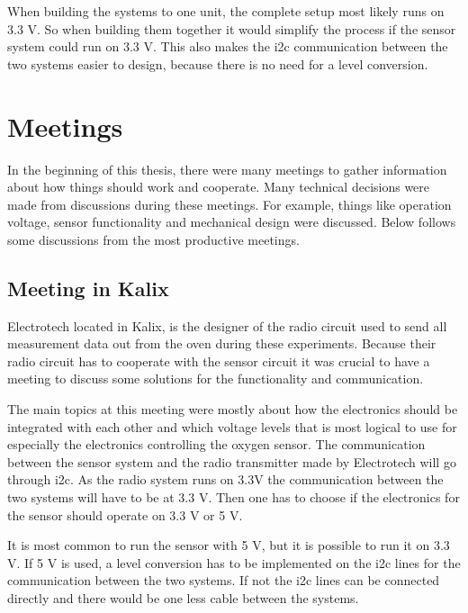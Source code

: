 When building the systems to one unit, the complete setup most likely runs on 3.3 V. So when building them together it would simplify the process if the sensor system could run on 3.3 V. This also makes the \ac{i2c} communication between the two systems easier to design, because there is no need for a level conversion.


\section{Meetings}





In the beginning of this thesis, there were many meetings to gather information about how things should work and cooperate. Many technical decisions were made from discussions during these meetings. For example, things like operation voltage, sensor functionality and mechanical design were discussed. Below follows some discussions from the most productive meetings.

\subsection{Meeting in Kalix}%

Electrotech located in Kalix, is the designer of the radio circuit used to send all measurement data out from the oven during these experiments. Because their radio circuit has to cooperate with the sensor circuit it was crucial to have a meeting to discuss some solutions for the functionality and communication.

The main topics at this meeting were mostly about how the electronics should be integrated with each other and which voltage levels that is most logical to use for especially the electronics controlling the oxygen sensor. The communication between the sensor system and the radio transmitter made by Electrotech will go through \ac{i2c}. As the radio system runs on 3.3V the communication between the two systems will have to be at 3.3 V. Then one has to choose if the electronics for the sensor should operate on 3.3 V or 5 V. 

It is most common to run the sensor with 5 V, but it is possible to run it on 3.3 V. If 5 V is used, a level conversion has to be implemented on the \ac{i2c} lines for the communication between the two systems. If not the \ac{i2c} lines can be connected directly and there would be one less cable between the systems. 

